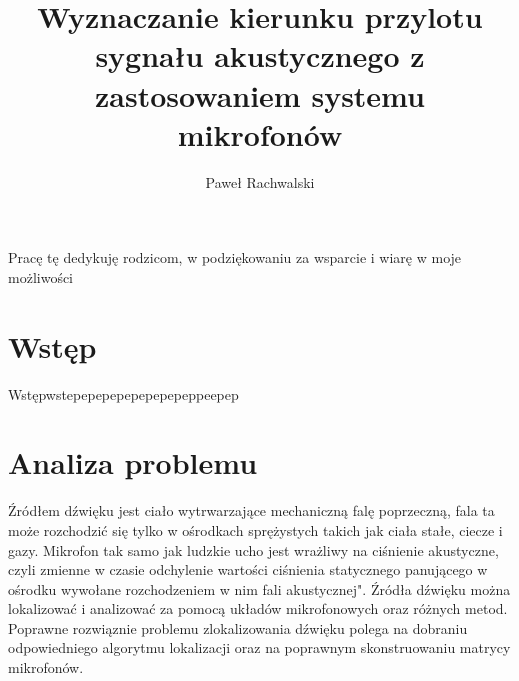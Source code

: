 \documentclass[eng,printmode]{mgr}
\title{Wyznaczanie kierunku przylotu sygnału akustycznego z zastosowaniem systemu mikrofonów}
\author{Paweł Rachwalski}
\begin{document}

\maketitle %
\dedication{6cm}{Pracę tę dedykuję rodzicom, w podziękowaniu za wsparcie i wiarę w moje możliwości}

\tableofcontents %

\chapter{Wstęp}
Wstępwstepepepepepepepepeppeepep

\chapter{Analiza problemu}
Źródłem dźwięku jest ciało wytrwarzające mechaniczną falę poprzeczną, fala ta może rozchodzić się tylko w ośrodkach sprężystych takich jak ciała stałe, ciecze i gazy. Mikrofon tak samo jak ludzkie ucho jest wrażliwy na ciśnienie akustyczne,  czyli zmienne w czasie odchylenie wartości ciśnienia statycznego panującego w ośrodku wywołane rozchodzeniem w nim fali akustycznej". %
Źródła dźwięku można lokalizować i analizować za pomocą układów mikrofonowych oraz różnych metod. Poprawne rozwiąznie problemu zlokalizowania dźwięku polega na dobraniu odpowiedniego algorytmu lokalizacji oraz na poprawnym skonstruowaniu matrycy mikrofonów. 
 \newline
\end{document}
